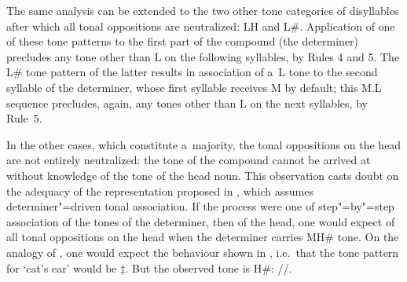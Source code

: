 \begin{figure}[p]
	\label{fig:toneMHcomp}
\end{figure}


The same analysis can be extended to the two other
tone categories of disyllables after which all tonal oppositions are neutralized: LH and L\#. Application of one of these tone patterns to the first part of the compound (the determiner) precludes any
tone other than L on the following syllables, by Rules 4 and 5. The L\# tone pattern of the latter results in association of a~L tone to the second syllable of the determiner, whose first syllable receives M by default; this M.L sequence
precludes, again, any tones other than L on the next syllables, by Rule~5.

In the other cases, which constitute a~majority, the tonal oppositions on the head are not
entirely neutralized: the tone of the compound cannot be arrived at without knowledge of the tone of the head noun. This observation casts doubt on the adequacy of the representation proposed in , which assumes determiner"=driven tonal association. If the process were one of step"=by"=step association of the tones of the determiner, then of the head, one would expect  of all tonal oppositions on the head when the determiner carries MH\# tone. On the {analogy} of , one would expect the behaviour shown in , i.e.\ that the tone pattern for ‘cat's ear’ would be $\ddagger${\kern2pt}. But the observed tone is H\#: //. 

